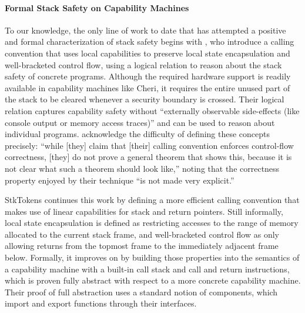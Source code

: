 \documentclass[acmsmall,review,anonymous]{acmart}\settopmatter{printfolios=true,printccs=false,printacmref=false}
\begin{document}
{\paragraph{Formal Stack Safety on Capability Machines}
%
To our knowledge, the only line of work to date that has attempted
a positive and formal characterization of
stack safety begins with \citet{SkorstengaardLocal}, who introduce a calling
convention that uses local capabilities to preserve local state
encapsulation and well-bracketed control flow, using a logical
relation to reason about the stack safety of concrete
programs. Although the required hardware support is readily available
in capability machines like Cheri,
it requires the entire unused part of the stack to be
cleared whenever a security boundary is crossed. Their logical
relation captures capability safety without ``externally observable
side-effects (like console output or memory access traces)''
and can be used to reason about individual programs.
\citeauthor{SkorstengaardSTK} acknowledge the difficulty of defining
these concepts precisely:
``while [they] claim that [their] calling
convention enforces control-flow correctness, [they] do not prove a
general theorem that shows this, because it is not clear what such a
theorem should look like,'' noting that the correctness property
enjoyed by their technique ``is not made very explicit.''

StkTokens \citep{SkorstengaardSTK} continues this work by defining a more efficient
calling convention that makes use of linear capabilities for stack and return
pointers.
Still informally, local state encapsulation is defined as
restricting accesses to the range of memory allocated to the current stack
frame, and well-bracketed control flow as only allowing returns from the topmost
frame to the immediately adjacent frame below. Formally, it improves on
\citet{SkorstengaardLocal} by building those properties into the semantics of a
capability machine with a built-in call stack and call and return instructions,
which is proven fully abstract with respect to a more concrete capability
machine.
Their proof of full abstraction uses a standard notion of components, which
import and export functions through their interfaces.

}
\end{document}
